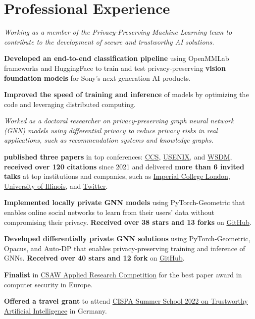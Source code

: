 \documentclass[11pt]{article}
\begin{document}
\section{Professional Experience}

\begin{outerlist}

{\textit{Working as a member of the Privacy-Preserving Machine Learning team to contribute to the development of secure and trustworthy AI solutions.}
  \begin{innerlist}
    \item \textbf{Developed an end-to-end classification pipeline} using OpenMMLab frameworks and HuggingFace to train and test privacy-preserving \textbf{vision foundation models} for Sony's next-generation AI products.
    \item \textbf{Improved the speed of training and inference} of models by optimizing the code and leveraging distributed computing.
  \end{innerlist}}

{\textit{Worked as a doctoral researcher on privacy-preserving graph neural network (GNN) models using differential privacy to reduce privacy risks in real applications, such as recommendation systems and knowledge graphs.}
	\begin{innerlist}
		\item \textbf{published three papers} in top conferences: \href{https://www.sigsac.org/ccs/CCS2021/}{CCS}, \href{https://www.usenix.org/conference/usenixsecurity23/}{USENIX}, and \href{https://www.wsdm-conference.org/2024/}{WSDM}, \textbf{received over 120 citations} since 2021 and delivered \textbf{more than 6 invited talks} at top institutions and companies, such as \href{https://ix.imperial.ac.uk/}{Imperial College London}, \href{https://cs.uic.edu/}{University of Illinois}, and \href{https://twitter.com/}{Twitter}.
		\item \textbf{Implemented locally private GNN models} using {PyTorch-Geometric} that enables online social networks to learn from their users' data without compromising their privacy. \textbf{Received over 38 stars and 13 forks} on \href{https://github.com/sisaman/LPGNN}{GitHub}.
		\item \textbf{Developed differentially private GNN solutions} using {PyTorch-Geometric}, {Opacus}, and {Auto-DP} that enables privacy-preserving training and inference of GNNs. \textbf{Received over 40 stars and 12 fork} on \href{https://github.com/sisaman/GAP}{GitHub}.
		\item \textbf{Finalist} in \href{https://www.csaw.io/research}{CSAW Applied Research Competition} for the best paper award in computer security in Europe.
		\item \textbf{Offered a travel grant} to attend \href{https://cispa.de/en/summer-school-2022}{CISPA Summer School 2022 on Trustworthy Artificial Intelligence} in Germany.
	\end{innerlist}}


\end{outerlist}
\end{document}
